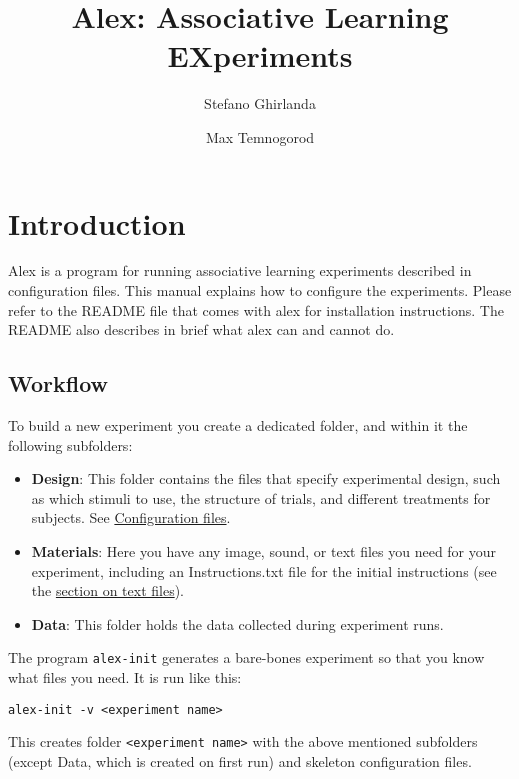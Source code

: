 \documentclass[11pt,]{article}
\title{Alex: Associative Learning EXperiments}
\author{Stefano Ghirlanda \and Max Temnogorod}
\date{}
\begin{document}
\maketitle

{
\hypersetup{linkcolor=black}
\setcounter{tocdepth}{3}
\begin{spacing}{0}
\small
\tableofcontents
\end{spacing}
\clearpage
}
\section{Introduction}\label{intro}

Alex is a program for running associative learning experiments described
in configuration files. This manual explains how to configure the
experiments. Please refer to the README file that comes with alex for
installation instructions. The README also describes in brief what alex
can and cannot do.

\subsection{Workflow}\label{workflow}

To build a new experiment you create a dedicated folder, and within it
the following subfolders:

\begin{itemize}
\item
  \textbf{Design}: This folder contains the files that specify
  experimental design, such as which stimuli to use, the structure of
  trials, and different treatments for subjects. See
  \hyperref[configuration-files]{Configuration files}.
\item
  \textbf{Materials}: Here you have any image, sound, or text files you
  need for your experiment, including an Instructions.txt file for the
  initial instructions (see the \hyperref[textfiles]{section on text
  files}).
\item
  \textbf{Data}: This folder holds the data collected during experiment
  runs.
\end{itemize}

The program \texttt{alex-init} generates a bare-bones experiment so that
you know what files you need. It is run like this:

\begin{verbatim}
alex-init -v <experiment name>
\end{verbatim}

This creates folder \texttt{\textless{}experiment name\textgreater{}}
with the above mentioned subfolders (except Data, which is created on
first run) and skeleton configuration files.
\end{document}
